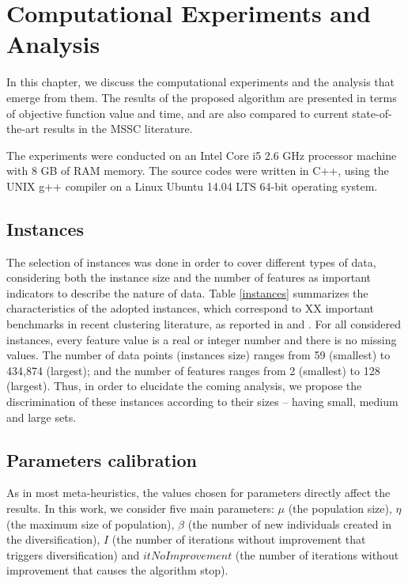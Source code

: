 \chapter{Computational Experiments and Analysis}
In this chapter, we discuss the computational experiments and the analysis that emerge from them. The results of the proposed algorithm are presented in terms of objective function value and time, and are also compared to current state-of-the-art results in the MSSC literature.

The experiments were conducted on an Intel Core i5 2.6 GHz processor machine with 8 GB of RAM memory. The source codes were written in C++, using the UNIX g++ compiler on a Linux Ubuntu 14.04 LTS 64-bit operating system.

\section{Instances}
The selection of instances was done in order to cover different types of data, considering both the instance size and the number of features as important indicators to describe the nature of data. Table \ref{instances} summarizes the characteristics of the adopted instances, which correspond to XX important benchmarks in recent clustering literature, as reported in \cite{Ordin2014} and \cite{Bagirov2016}. For all considered instances, every feature value is a real or integer number and there is no missing values. The number of data points (instances size) ranges from 59 (smallest) to 434,874 (largest); and the number of features ranges from 2 (smallest) to 128 (largest). Thus, in order to elucidate the coming analysis, we propose the discrimination of these instances according to their sizes -- having small, medium and large sets. %



\section{Parameters calibration}
As in most meta-heuristics, the values chosen for parameters directly affect the results. In this work, we consider five main parameters: $\mu$ (the population size), $\eta$ (the maximum size of population), $\beta$ (the number of new individuals created in the diversification), $I$ (the number of iterations without improvement that triggers diversification) and $itNoImprovement$ (the number of iterations without improvement that causes the algorithm stop).


